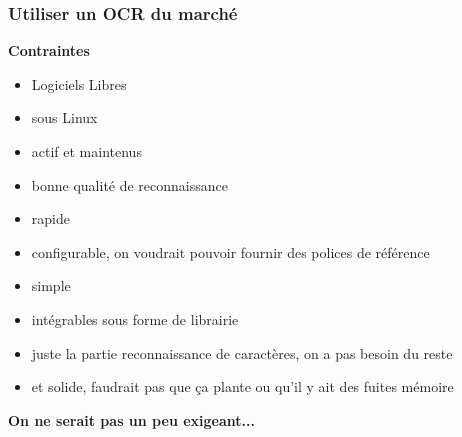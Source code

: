 \documentclass[xcolor=dvipsnames]{beamer}
\begin{document}
\begin{frame}
\frametitle{Utiliser un OCR du marché}
    \begin{center}\begin{alertblock}{}
            \textbf{\Large Contraintes}\pause
        \begin{itemize}
        \item Logiciels Libres\pause
        \item sous Linux\pause
        \item actif et maintenus\pause
        \item bonne qualité de reconnaissance\pause
        \item rapide\pause
        \item configurable, on voudrait pouvoir fournir des polices de référence\pause
        \item simple\pause
        \item intégrables sous forme de librairie\pause
        \item juste la partie reconnaissance de caractères, on a pas besoin du reste\pause
        \item et solide, faudrait pas que ça plante ou qu'il y ait des fuites mémoire\pause
        \end{itemize}
    \end{alertblock}\end{center}
    \begin{center}\begin{alertblock}{}
            \begin{center}\textbf{\Large On ne serait pas un peu exigeant...}\end{center}
    \end{alertblock}\end{center}
\end{frame}
\end{document}
